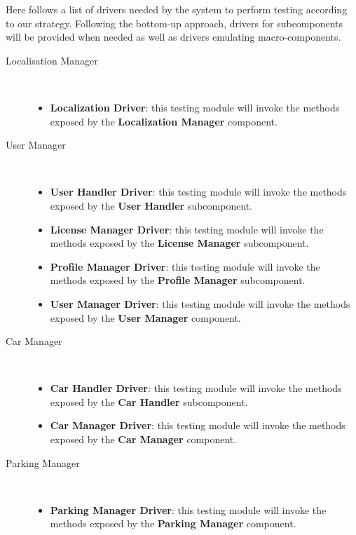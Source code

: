 		Here follows a list of drivers needed by the system to perform testing according to our strategy. Following the bottom-up approach, drivers for subcomponents will be provided when needed as well as drivers emulating macro-components.
		
		\begin{description}
		\item[Localisation Manager]~\\
			\begin{itemize}
				\item \textbf{Localization Driver}: this testing module will invoke the methods exposed by the \textbf{Localization Manager} component.
			\end{itemize}
		\item[User Manager]~\\ 
			\begin{itemize}
				\item \textbf{User Handler Driver}: this testing module will invoke the methods exposed by the \textbf{User Handler} subcomponent.
				\item \textbf{License Manager Driver}: this testing module will invoke the methods exposed by the \textbf{License Manager} subcomponent.
				\item \textbf{Profile Manager Driver}: this testing module will invoke the methods exposed by the \textbf{Profile Manager} subcomponent.
				\item \textbf{User Manager Driver}: this testing module will invoke the methods exposed by the \textbf{User Manager} component.
			\end{itemize}
		\item[Car Manager]~\\
			\begin{itemize}
				\item \textbf{Car Handler Driver}: this testing module will invoke the methods exposed by the \textbf{Car Handler} subcomponent.
				\item \textbf{Car Manager Driver}: this testing module will invoke the methods exposed by the \textbf{Car Manager} component.
			\end{itemize}
		\item[Parking Manager]~\\
			\begin{itemize}
				\item \textbf{Parking Manager Driver}: this testing module will invoke the methods exposed by the \textbf{Parking Manager} component.
			\end{itemize}

\end{description}
